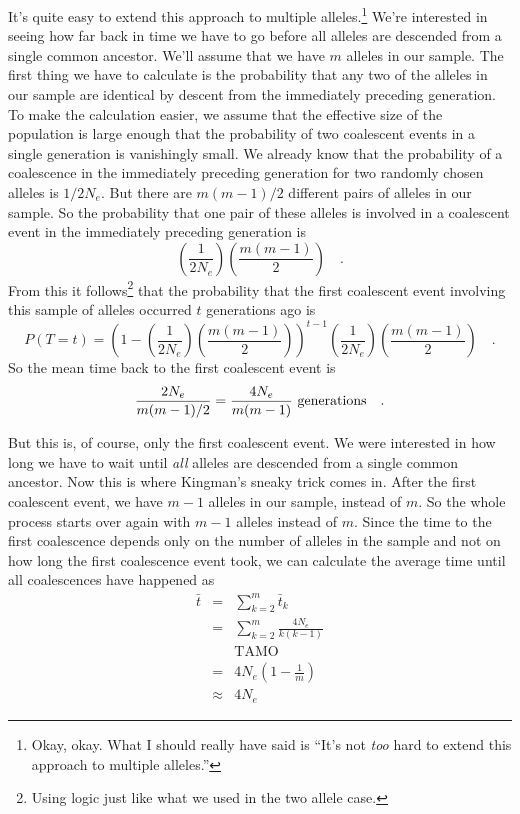 It's quite easy to extend this approach to multiple
alleles.\footnote{Okay, okay. What I should really have said is ``It's
not {\it too\/} hard to extend this approach to multiple alleles.''}
We're interested in seeing how far back in time we have to go before
all alleles are descended from a single common ancestor. We'll assume
that we have $m$ alleles in our sample. The first thing we have to
calculate is the probability that any two of the alleles in our sample
are identical by descent from the immediately preceding generation. To
make the calculation easier, we assume that the effective size of the
population is large enough that the probability of two coalescent
events in a single generation is vanishingly small. We already know
that the probability of a coalescence in the immediately preceding
generation for two randomly chosen alleles is $1/2N_e$. But there are
$m(m-1)/2$ different pairs of alleles in our sample. So the
probability that one pair of these alleles is involved in a coalescent
event in the immediately preceding generation is
\[
\left(\frac{1}{2N_e}\right)\left(\frac{m(m-1)}{2}\right) \quad .
\]
From this it follows\footnote{Using logic just like what we used in
the two allele case.} that the probability that the first coalescent
event involving this sample of alleles occurred $t$ generations ago is
\begin{equation}
P(T=t) = 
\left(1-\left(\frac{1}{2N_e}\right)\left(\frac{m(m-1)}{2}\right)\right)^{t-1}
\left(\frac{1}{2N_e}\right)\left(\frac{m(m-1)}{2}\right)
\quad .
\label{eq:multi-allele}
\end{equation}
So the mean time back to the first coalescent event is
\[
\frac{2N_e}{m(m-1)/2} = \frac{4N_e}{m(m-1)} \hbox{ generations} \quad .
\]

But this is, of course, only the first coalescent event. We were
interested in how long we have to wait until {\it all\/} alleles are
descended from a single common ancestor. Now this is where Kingman's
sneaky trick comes in. After the first coalescent event, we have $m-1$
alleles in our sample, instead of $m$. So the whole process starts
over again with $m-1$ alleles instead of $m$. Since the time to the
first coalescence depends only on the number of alleles in the sample
and not on how long the first coalescence event took, we can calculate
the average time until all coalescences have happened
as
\begin{eqnarray*}
\bar t &=& \sum_{k=2}^m \bar t_k \\
       &=& \sum_{k=2}^m \frac{4N_e}{k(k-1)} \\
       && \mbox{TAMO} \\
       &=& 4N_e\left(1 - \frac{1}{m}\right) \\
       &\approx& 4N_e
\end{eqnarray*}


